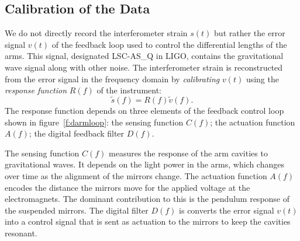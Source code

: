 \subsection{Calibration of the Data}
\label{ss:calibration}

We do not directly record the interferometer strain $s(t)$ but rather the
error signal $v(t)$ of the feedback loop used to control the differential
lengths of the arms. This signal, designated {LSC-AS\_Q} in LIGO,
contains the gravitational wave signal along with other noise. The
interferometer strain is reconstructed from the error signal in the
frequency domain by \emph{calibrating} $v(t)$ using the \emph{response
function} $R(f)$ of the instrument:
\begin{equation}
\tilde{s}(f) = R(f) \tilde{v}(f).
\end{equation}
The response function depends on three elements of the feedback control loop
shown in figure~\ref{f:darmloop}: the sensing function $C(f)$; the actuation
function $A(f)$; the digital feedback filter $D(f)$\cite{Gonzalez:2002}. 

The sensing function $C(f)$ measures the response of the arm cavities to
gravitational waves. It depends on the light power in the arms, which changes
over time as the alignment of the mirrors change.  The actuation function
$A(f)$ encodes the distance the mirrors move for the applied voltage at the
electromagnets. The dominant contribution to this is the pendulum response of
the suspended mirrors.  The digital filter $D(f)$ is converts the error signal
$v(t)$ into a control signal that is sent as actuation to the mirrors to keep
the cavities resonant.


